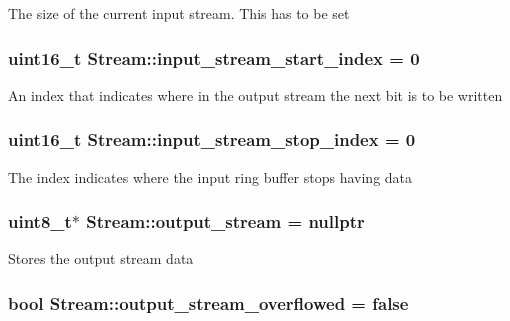 The size of the current input stream. This has to be set \hypertarget{class_stream_ade2d5afb993214626e7c7d66cb76cd46}{
\subsubsection[{input\-\_\-stream\-\_\-start\-\_\-index}]{\setlength{\rightskip}{0pt plus 5cm}uint16\-\_\-t Stream\-::input\-\_\-stream\-\_\-start\-\_\-index = 0\hspace{0.3cm}{\ttfamily [protected]}}}\label{class_stream_ade2d5afb993214626e7c7d66cb76cd46}
An index that indicates where in the output stream the next bit is to be written \hypertarget{class_stream_a52cf2f675dd7ec342615e82cc29513de}{
\subsubsection[{input\-\_\-stream\-\_\-stop\-\_\-index}]{\setlength{\rightskip}{0pt plus 5cm}uint16\-\_\-t Stream\-::input\-\_\-stream\-\_\-stop\-\_\-index = 0\hspace{0.3cm}{\ttfamily [protected]}}}\label{class_stream_a52cf2f675dd7ec342615e82cc29513de}
The index indicates where the input ring buffer stops having data \hypertarget{class_stream_ab2d136f405b24e5eb2a6058b24fabfa3}{
\subsubsection[{output\-\_\-stream}]{\setlength{\rightskip}{0pt plus 5cm}uint8\-\_\-t$\ast$ Stream\-::output\-\_\-stream = nullptr\hspace{0.3cm}{\ttfamily [protected]}}}\label{class_stream_ab2d136f405b24e5eb2a6058b24fabfa3}
Stores the output stream data \hypertarget{class_stream_a91eb40b21c46bd57b61811a890ac047a}{
\subsubsection[{output\-\_\-stream\-\_\-overflowed}]{\setlength{\rightskip}{0pt plus 5cm}bool Stream\-::output\-\_\-stream\-\_\-overflowed = false\hspace{0.3cm}{\ttfamily [protected]}}}\label{class_stream_a91eb40b21c46bd57b61811a890ac047a}
